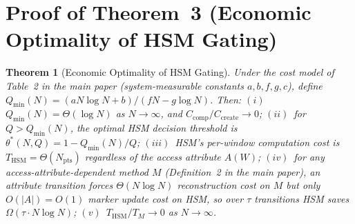 \documentclass[10pt,twocolumn,a4paper]{article}
\newtheorem{theorem}{Theorem}
\newcommand{\Npts}{N_{\mathrm{pts}}}
\newcommand{\thetastar}{\theta^{*}}
\begin{document}
\section{Proof of Theorem~3 (Economic Optimality of HSM Gating)}

\begin{theorem}[Economic Optimality of HSM Gating]
Under the cost model of Table~2 in the main paper (system-measurable
constants $a,b,f,g,c$), define
$Q_{\min}(N)=(aN\log N+b)/(fN-g\log N)$. Then:
$(i)$~$Q_{\min}(N)=\Theta(\log N)$ as $N\to\infty$, and
$C_{\mathrm{comp}}/C_{\mathrm{create}}\to0$;
$(ii)$~for $Q>Q_{\min}(N)$, the optimal HSM decision threshold is
$\thetastar(N,Q)=1-Q_{\min}(N)/Q$;
$(iii)$~HSM's per-window computation cost is
$T_{\mathrm{HSM}}=\Theta(\Npts)$ \emph{regardless} of the access
attribute $A(W)$;
$(iv)$~for any access-attribute-dependent method $M$
(Definition~2 in the main paper), an attribute transition forces
$\Theta(N\log N)$ reconstruction cost on $M$ but only $O(|A|)=O(1)$
marker update cost on HSM, so over $\tau$ transitions HSM saves
$\Omega(\tau\cdot N\log N)$;
$(v)$~$T_{\mathrm{HSM}}/T_{M}\to0$ as $N\to\infty$.
\end{theorem}
\end{document}
